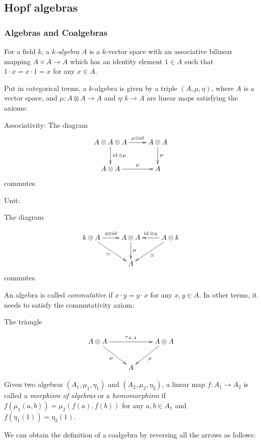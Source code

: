 \documentclass[]{article}
\newcommand{\id}{\operatorname{id}}
\numberwithin{equation}{subsection}
\begin{document}
\subsection{Hopf algebras}
\subsubsection{Algebras and Coalgebras}
For a field $k$, a \emph{$k$-algebra} $A$ is a $k$-vector space with an
associative bilinear mapping $A \times A \to A$ which has an identity element
$1 \in A$ such that $1\cdot x = x\cdot 1 = x$ for any $x \in A$.

Put in categorical terms, a $k$-algebra is given by a triple $(A, \mu, \eta)$,
where $A$ is a vector space, and $\mu: A \otimes A \to A$ and $\eta: k \to A$
are linear maps satisfying the axioms:

Associativity:
The diagram
\begin{equation}
\xymatrix{
A \otimes A \otimes A \ar[d]^-{\id \otimes \mu} \ar[r]^-{\mu \otimes \id} & A \otimes A \ar[d]^-{\mu}\\
 A \otimes A \ar[r]^-\mu & A 
}
\end{equation}
commutes.

Unit: 

The diagram

\begin{equation}
    \xymatrix{
    k \otimes A \ar[r]^-{\eta \otimes \id} \ar[rd]_\simeq & A \otimes A \ar[d]^-\mu & A \otimes k \ar[l]_{\id \otimes \eta} \ar[ld]^-{\simeq} \\
    & A &
    }
\end{equation}
commutes.

An algebra is called \emph{commutative} if $x \cdot y = y \cdot x$ for any $x,y\in A$. In other terms, it needs to satisfy the commutativity axiom:

The triangle 

\begin{equation}
    \xymatrix{
    A \otimes A \ar[rr]^-{\tau_{A,A}} \ar[rd]_\mu & & A \otimes A \ar[ld]^-\mu \\
    & A &
    }
\end{equation}

Given two algebras $(A_1, \mu_1, \eta_1)$ and $(A_2, \mu_2, \eta_2)$, a linear
map $f: A_1 \to A_2$ is called a \emph{morphism of algebras} or a
\emph{homomorphism} if $f(\mu_1(a,b)) = \mu_2(f(a), f(b))$ for any $a,b\in A_1$ and $f(\eta_1(1)) = \eta_2(1)$.


We can obtain the definition of a coalgebra by reversing all the arrows as follows:
\end{document}
